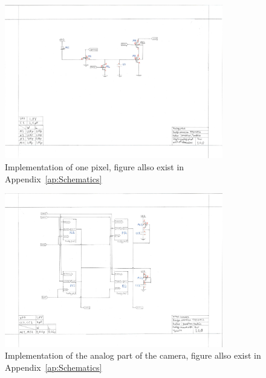 \begin{figure}[htbp]
  \centering
  \includegraphics[width=0.85\textwidth]{figures/SchematicPixel}
  \caption{Implementation of one pixel, figure allso exist in Appendix~\ref{ap:Schematics}}
  \label{fig:implpixel}
\end{figure}
\begin{figure}[htbp]
  \centering
  \includegraphics[width=0.85\textwidth]{figures/SchematicCamera}
  \caption{Implementation of the analog part of the camera, figure allso exist in Appendix~\ref{ap:Schematics}}
  \label{fig:implcamera}
\end{figure}